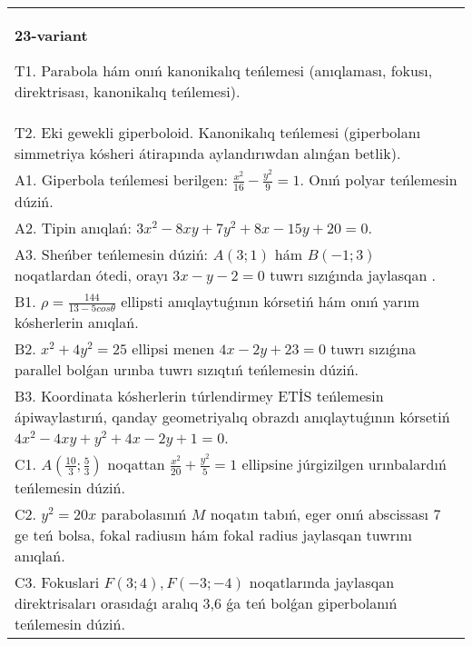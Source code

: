 \documentclass{article}
\begin{document}
\begin{tabular}{m{17cm}}
\textbf{23-variant}
\newline

T1. Parabola hám onıń kanonikalıq teńlemesi (anıqlaması, fokusı, direktrisası, kanonikalıq teńlemesi).\\

T2. Eki gewekli giperboloid. Kanonikalıq teńlemesi (giperbolanı simmetriya kósheri átirapında aylandırıwdan alınǵan betlik).\\

A1. Giperbola teńlemesi berilgen: $\frac{x^{2}}{16}-\frac{y^{2}}{9}=1$. Onıń polyar teńlemesin dúziń.\\

A2. Tipin anıqlań: $3 x^{2}-8 xy+7 y^{2}+8 x-15 y+20=0$.\\

A3. Sheńber teńlemesin dúziń: $A (3;1) $ hám $B (-1;3) $ noqatlardan ótedi, orayı $3 x-y-2=0$ tuwrı sızıǵında jaylasqan .\\

B1. $\rho = \frac{144}{13 - 5cos\theta}$ ellipsti anıqlaytuǵının kórsetiń hám onıń yarım kósherlerin anıqlań.\\

B2. $x^{2} + 4y^{2} = 25$ ellipsi menen $4x - 2y + 23 = 0$ tuwrı sızıǵına parallel bolǵan urınba tuwrı sızıqtıń teńlemesin dúziń.  \\

B3. Koordinata kósherlerin túrlendirmey ETİS teńlemesin ápiwaylastırıń, qanday geometriyalıq obrazdı anıqlaytuǵının kórsetiń $4x^{2} - 4xy + y^{2} + 4x - 2y + 1 = 0$.  \\

C1. $A(\frac{10}{3};\frac{5}{3})$ noqattan $\frac{x^{2}}{20} + \frac{y^{2}}{5} = 1$ ellipsine júrgizilgen urınbalardıń teńlemesin dúziń.  \\

C2. $y^{2} = 20x$ parabolasınıń $M$ noqatın tabıń, eger onıń abscissası 7 ge teń bolsa, fokal radiusın hám fokal radius jaylasqan tuwrını anıqlań.\\

C3. Fokuslari $F(3;4), F(-3;-4)$ noqatlarında jaylasqan direktrisaları orasıdaǵı aralıq 3,6 ǵa teń bolǵan giperbolanıń teńlemesin dúziń.  \\

\end{tabular}
\vspace{1cm}
\end{document}
